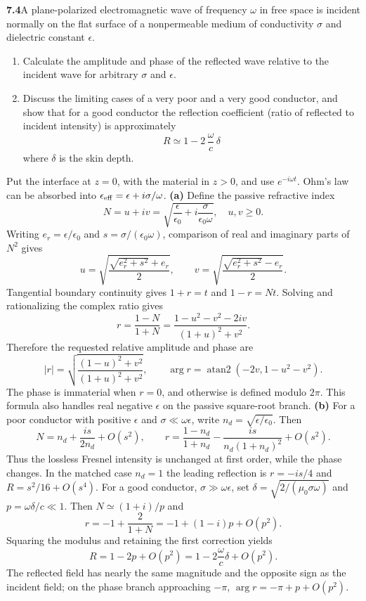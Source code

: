 \par\bigskip
\noindent\textbf{7.4}\quad A plane-polarized electromagnetic wave of frequency $\omega$ in free space is incident normally on the flat surface of a nonpermeable medium of conductivity $\sigma$ and dielectric constant $\epsilon$.
\begin{enumerate}
\item[(a)] Calculate the amplitude and phase of the reflected wave relative to the incident wave for arbitrary $\sigma$ and $\epsilon$.
\item[(b)] Discuss the limiting cases of a very poor and a very good conductor, and show that for a good conductor the reflection coefficient (ratio of reflected to incident intensity) is approximately
\[
R\simeq 1-2\,\frac{\omega}{c}\,\delta
\]
where $\delta$ is the skin depth.
\end{enumerate}
\solution
Put the interface at $z=0$, with the material in $z>0$, and use
$e^{-i\omega t}$. Ohm's law can be absorbed into
$\epsilon_{\rm eff}=\epsilon+i\sigma/\omega$.
\textbf{(a)} Define the passive refractive index
\[
N=u+iv=\sqrt{\frac\epsilon{\epsilon_0}+i\frac\sigma{\epsilon_0\omega}},
\quad u,v\geq0.
\]
Writing $e_r=\epsilon/\epsilon_0$ and $s=\sigma/(\epsilon_0\omega)$,
comparison of real and imaginary parts of $N^2$ gives
\[
u=\sqrt{\frac{\sqrt{e_r^2+s^2}+e_r}{2}},\qquad
v=\sqrt{\frac{\sqrt{e_r^2+s^2}-e_r}{2}}.
\]
Tangential boundary continuity gives $1+r=t$ and $1-r=Nt$.
Solving and rationalizing the complex ratio gives
\[
r=\frac{1-N}{1+N}
=\frac{1-u^2-v^2-2iv}{(1+u)^2+v^2}.
\]
Therefore the requested relative amplitude and phase are
\[
\boxed{|r|=\sqrt{\frac{(1-u)^2+v^2}{(1+u)^2+v^2}},\qquad
\arg r=\operatorname{atan2}(-2v,1-u^2-v^2).}
\]
The phase is immaterial when $r=0$, and otherwise is defined modulo
$2\pi$. This formula also handles real negative $\epsilon$ on the
passive square-root branch.
\textbf{(b)} For a poor conductor with positive $\epsilon$ and
$\sigma\ll\omega\epsilon$, write $n_d=\sqrt{\epsilon/\epsilon_0}$.
Then
\[
N=n_d+\frac{is}{2n_d}+O(s^2),\qquad
r=\frac{1-n_d}{1+n_d}
 -\frac{is}{n_d(1+n_d)^2}+O(s^2).
\]
Thus the lossless Fresnel intensity is unchanged at first order,
while the phase changes. In the matched case $n_d=1$ the leading
reflection is $r=-is/4$ and $R=s^2/16+O(s^4)$.
For a good conductor, $\sigma\gg\omega\epsilon$, set
$\delta=\sqrt{2/(\mu_0\sigma\omega)}$ and $p=\omega\delta/c\ll1$.
Then $N\simeq(1+i)/p$ and
\[
r=-1+\frac2{1+N}=-1+(1-i)p+O(p^2).
\]
Squaring the modulus and retaining the first correction yields
\[
\boxed{R=1-2p+O(p^2)=1-2\frac\omega c\delta+O(p^2).}
\]
The reflected field has nearly the same magnitude and the opposite
sign as the incident field; on the phase branch approaching $-\pi$,
$\arg r=-\pi+p+O(p^2)$.

